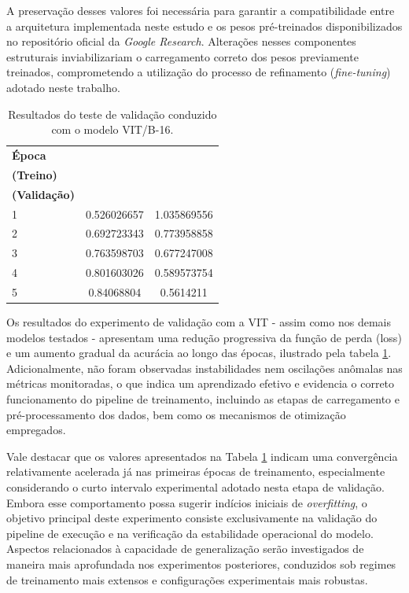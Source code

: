 A preservação desses valores foi necessária para garantir a compatibilidade entre a arquitetura implementada neste estudo e os pesos pré-treinados disponibilizados no repositório oficial da \textit{Google Research}. Alterações nesses componentes estruturais inviabilizariam o carregamento correto dos pesos previamente treinados, comprometendo a utilização do processo de refinamento (\textit{fine-tuning}) adotado neste trabalho.

\begin{table}[h]
	\centering
	\caption{Resultados do teste de validação conduzido com o modelo \acs{VIT}/B-16.}
	
	\begin{tabular}{l|c|c}
		
		\toprule
		\textbf{Época} & 
		\makecell{\textbf{Perda}\\ \textbf{(Treino)}} &
		\makecell{\textbf{Perda}\\ \textbf{(Validação)}} \\
		
		\midrule
		
		1  & 0.526026657 & 1.035869556\\
		2  & 0.692723343 & 0.773958858\\
		3  & 0.763598703 & 0.677247008\\
		4  & 0.801603026 & 0.589573754\\
		5  & 0.84068804 & 0.5614211\\
		\bottomrule
	\end{tabular}
	\label{tab:vit_sanity}
\end{table}

Os resultados do experimento de validação com a \acs{VIT} - assim como nos demais modelos testados - apresentam uma redução progressiva da função de perda (loss) e um aumento gradual da acurácia ao longo das épocas, ilustrado pela tabela \ref{tab:vit_sanity}. Adicionalmente, não foram observadas instabilidades nem oscilações anômalas nas métricas monitoradas, o que indica um aprendizado efetivo e evidencia o correto funcionamento do pipeline de treinamento, incluindo as etapas de carregamento e pré-processamento dos dados, bem como os mecanismos de otimização empregados. 

Vale destacar que os valores apresentados na Tabela \ref{tab:vit_sanity} indicam uma convergência relativamente acelerada já nas primeiras épocas de treinamento, especialmente considerando o curto intervalo experimental adotado nesta etapa de validação. Embora esse comportamento possa sugerir indícios iniciais de \textit{overfitting}, o objetivo principal deste experimento consiste exclusivamente na validação do pipeline de execução e na verificação da estabilidade operacional do modelo. Aspectos relacionados à capacidade de generalização serão investigados de maneira mais aprofundada nos experimentos posteriores, conduzidos sob regimes de treinamento mais extensos e configurações experimentais mais robustas.

